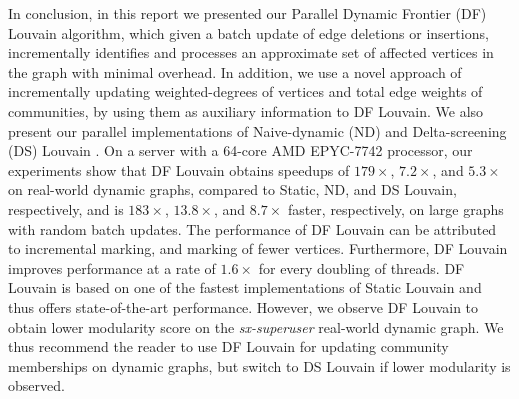 In conclusion, in this report we presented our Parallel Dynamic Frontier (DF) Louvain algorithm, which given a batch update of edge deletions or insertions, incrementally identifies and processes an approximate set of affected vertices in the graph with minimal overhead. In addition, we use a novel approach of incrementally updating weighted-degrees of vertices and total edge weights of communities, by using them as auxiliary information to DF Louvain. We also present our parallel implementations of Naive-dynamic (ND) \cite{com-aynaud10} and Delta-screening (DS) Louvain \cite{com-zarayeneh21}. On a server with a 64-core AMD EPYC-7742 processor, our experiments show that DF Louvain obtains speedups of $179\times$, $7.2\times$, and $5.3\times$ on real-world dynamic graphs, compared to Static, ND, and DS Louvain, respectively, and is $183\times$, $13.8\times$, and $8.7\times$ faster, respectively, on large graphs with random batch updates. The performance of DF Louvain can be attributed to incremental marking, and marking of fewer vertices. Furthermore, DF Louvain improves performance at a rate of $1.6\times$ for every doubling of threads. DF Louvain is based on one of the fastest implementations of Static Louvain \cite{sahu2023gvelouvain} and thus offers state-of-the-art performance. However, we observe DF Louvain to obtain lower modularity score on the \textit{sx-superuser} real-world dynamic graph. We thus recommend the reader to use DF Louvain for updating community memberships on dynamic graphs, but switch to DS Louvain if lower modularity is observed.
